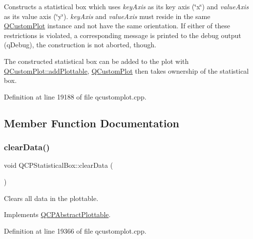 Constructs a statistical box which uses {\itshape key\+Axis} as its key axis (\char`\"{}x\char`\"{}) and {\itshape value\+Axis} as its value axis (\char`\"{}y\char`\"{}). {\itshape key\+Axis} and {\itshape value\+Axis} must reside in the same \hyperlink{class_q_custom_plot}{Q\+Custom\+Plot} instance and not have the same orientation. If either of these restrictions is violated, a corresponding message is printed to the debug output (q\+Debug), the construction is not aborted, though.

The constructed statistical box can be added to the plot with \hyperlink{class_q_custom_plot_ab7ad9174f701f9c6f64e378df77927a6}{Q\+Custom\+Plot\+::add\+Plottable}, \hyperlink{class_q_custom_plot}{Q\+Custom\+Plot} then takes ownership of the statistical box. 

Definition at line 19188 of file qcustomplot.\+cpp.



\subsection{Member Function Documentation}
\mbox{\label{class_q_c_p_statistical_box_a19112994449df0c20287858436cc68e3}} 
\subsubsection{\texorpdfstring{clear\+Data()}{clearData()}}
{\footnotesize\ttfamily void Q\+C\+P\+Statistical\+Box\+::clear\+Data (\begin{DoxyParamCaption}{ }\end{DoxyParamCaption})\hspace{0.3cm}{\ttfamily [virtual]}}

Clears all data in the plottable. 

Implements \hyperlink{class_q_c_p_abstract_plottable_a86e5b8fd4b6ff4f4084e7ea4c573fc53}{Q\+C\+P\+Abstract\+Plottable}.



Definition at line 19366 of file qcustomplot.\+cpp.

\mbox{\label{class_q_c_p_statistical_box_a0153ac16326b94450afbca208e3f9961}} 

